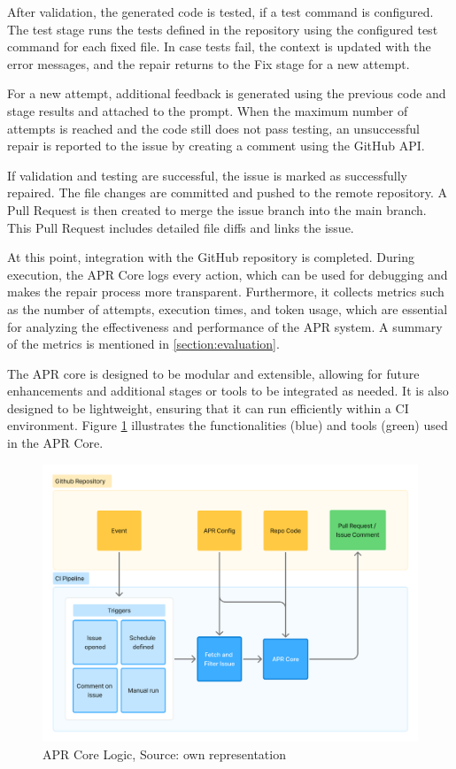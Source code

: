 After validation, the generated code is tested, if a test command is configured. The test stage runs the tests defined in the repository using the configured test command for each fixed file. In case tests fail, the context is updated with the error messages, and the repair returns to the Fix stage for a new attempt.

For a new attempt, additional feedback is generated using the previous code and stage results and attached to the prompt. When the maximum number of attempts is reached and the code still does not pass testing, an unsuccessful repair is reported to the issue by creating a comment using the GitHub API.

If validation and testing are successful, the issue is marked as successfully repaired. The file changes are committed and pushed to the remote repository. A Pull Request is then created to merge the issue branch into the main branch. This Pull Request includes detailed file diffs and links the issue.

At this point, integration with the GitHub repository is completed. During execution, the APR Core logs every action, which can be used for debugging and makes the repair process more transparent. Furthermore, it collects metrics such as the number of attempts, execution times, and token usage, which are essential for analyzing the effectiveness and performance of the APR system. A summary of the metrics is mentioned in \ref{section:evaluation}.

The APR core is designed to be modular and extensible, allowing for future enhancements and additional stages or tools to be integrated as needed. It is also designed to be lightweight, ensuring that it can run efficiently within a CI environment. Figure \ref{fig:apr-core} illustrates the functionalities (blue) and tools (green) used in the APR Core.

\begin{figure}[H]
    \centering
    \includegraphics[width=1\textwidth]{images/flowcharts/apr_core.png}
    \caption{APR Core Logic, Source: own representation}
    \label{fig:apr-core}
\end{figure}

